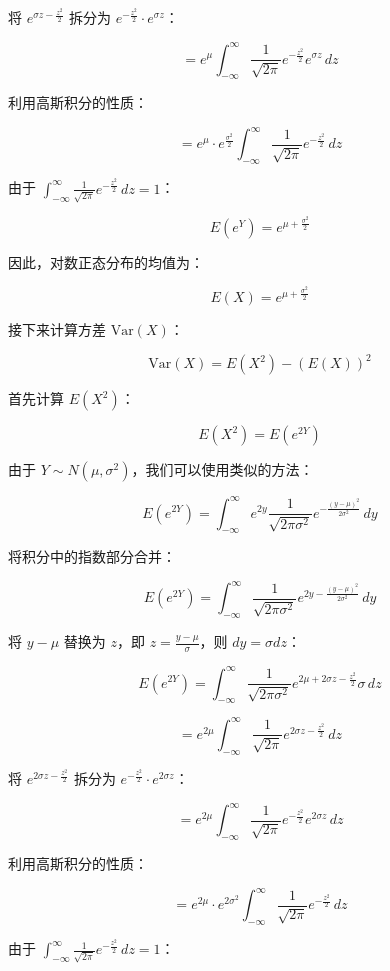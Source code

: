 \documentclass[UTF8]{report}
\theoremstyle{MyLineTheoremStyle} %
\theoremstyle{MyBlockTheoremStyle} %
\theoremstyle{MySubsubsectionStyle} %
\begin{document}
将 \(e^{\sigma z - \frac{z^2}{2}}\) 拆分为 \(e^{-\frac{z^2}{2}} \cdot e^{\sigma z}\)：

\[
= e^{\mu} \int_{-\infty}^{\infty} \frac{1}{\sqrt{2\pi}} e^{-\frac{z^2}{2}} e^{\sigma z} \, dz
\]

利用高斯积分的性质：

\[
= e^{\mu} \cdot e^{\frac{\sigma^2}{2}} \int_{-\infty}^{\infty} \frac{1}{\sqrt{2\pi}} e^{-\frac{z^2}{2}} \, dz
\]

由于 \(\int_{-\infty}^{\infty} \frac{1}{\sqrt{2\pi}} e^{-\frac{z^2}{2}} \, dz = 1\)：

\[
E(e^Y) = e^{\mu + \frac{\sigma^2}{2}}
\]

因此，对数正态分布的均值为：

\[
E(X) = e^{\mu + \frac{\sigma^2}{2}}
\]

接下来计算方差 \(\text{Var}(X)\)：

\[
\text{Var}(X) = E(X^2) - (E(X))^2
\]

首先计算 \(E(X^2)\)：

\[
E(X^2) = E(e^{2Y})
\]

由于 \(Y \sim N(\mu, \sigma^2)\)，我们可以使用类似的方法：

\[
E(e^{2Y}) = \int_{-\infty}^{\infty} e^{2y} \frac{1}{\sqrt{2\pi\sigma^2}} e^{-\frac{(y-\mu)^2}{2\sigma^2}} \, dy
\]

将积分中的指数部分合并：

\[
E(e^{2Y}) = \int_{-\infty}^{\infty} \frac{1}{\sqrt{2\pi\sigma^2}} e^{2y - \frac{(y-\mu)^2}{2\sigma^2}} \, dy
\]

将 \(y - \mu\) 替换为 \(z\)，即 \(z = \frac{y - \mu}{\sigma}\)，则 \(dy = \sigma dz\)：

\[
E(e^{2Y}) = \int_{-\infty}^{\infty} \frac{1}{\sqrt{2\pi\sigma^2}} e^{2\mu + 2\sigma z - \frac{z^2}{2}} \sigma \, dz
\]

\[
= e^{2\mu} \int_{-\infty}^{\infty} \frac{1}{\sqrt{2\pi}} e^{2\sigma z - \frac{z^2}{2}} \, dz
\]

将 \(e^{2\sigma z - \frac{z^2}{2}}\) 拆分为 \(e^{-\frac{z^2}{2}} \cdot e^{2\sigma z}\)：

\[
= e^{2\mu} \int_{-\infty}^{\infty} \frac{1}{\sqrt{2\pi}} e^{-\frac{z^2}{2}} e^{2\sigma z} \, dz
\]

利用高斯积分的性质：

\[
= e^{2\mu} \cdot e^{2\sigma^2} \int_{-\infty}^{\infty} \frac{1}{\sqrt{2\pi}} e^{-\frac{z^2}{2}} \, dz
\]

由于 \(\int_{-\infty}^{\infty} \frac{1}{\sqrt{2\pi}} e^{-\frac{z^2}{2}} \, dz = 1\)：
\end{document}
